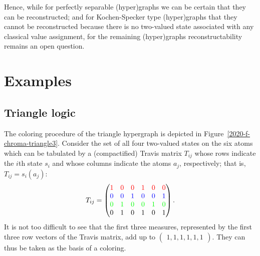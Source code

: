 \documentclass[%
12pt,
prereprint,
showpacs,
showkeys,
preprintnumbers,
amsmath,amssymb,
aps,
pra,
longbibliography,
notitlepage
]{revtex4-1}
\theoremstyle{definition}
\begin{document}
	Hence, while for perfectly separable (hyper)graphs we can be certain that they can be reconstructed; and for Kochen-Specker type (hyper)graphs that they cannot be reconstructed because there is no two-valued state associated with any classical value assignment, for the remaining (hyper)graphs reconstructability remains an open question.
	
	
	
	
	\appendix
	
	
	\section{Examples}
\label{AppendixA}
	\subsection{Triangle logic}
	
	The coloring procedure of the triangle hypergraph is depicted in Figure~\ref{2020-f-chroma-triangle3}.
	Consider the set of all four two-valued states on the six atoms which can be tabulated by a
	(compactified) Travis matrix $T_{ij}$
	whose rows indicate the
	$i$th state $s_i$ and whose columns
	indicate the atoms $a_j$, respectively; that is, $T_{ij}=s_i(a_j)$:
	\begin{equation}
		T_{ij}=\begin{pmatrix}
			{\color{red}1}&{\color{red}0}&{\color{red}0}&{\color{red}1}&{\color{red}0}&{\color{red}0}\\
			{\color{blue}0}&{\color{blue}0}&{\color{blue}1}&{\color{blue}0}&{\color{blue}0}&{\color{blue}1}\\
			{\color{green}0}&{\color{green}1}&{\color{green}0}&{\color{green}0}&{\color{green}1}&{\color{green}0}\\
			0&1&0&1&0&1
		\end{pmatrix}
		.
	\end{equation}
	It is not too difficult to see that the first three measures, represented by the first three row vectors of the
	Travis matrix, add up to
	$
	\begin{pmatrix}
		1,1,1,1,1,1
	\end{pmatrix}
	$. They can thus be taken as the basis of a coloring.
	
\end{document}
